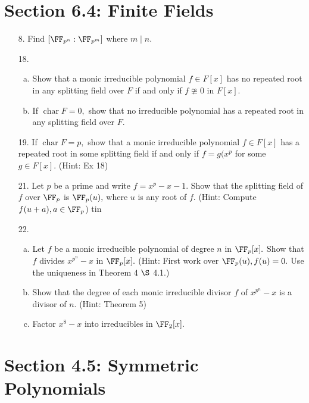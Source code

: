 \documentclass{article}
\DeclareMathOperator{\cha}{char}
\begin{document}
\section*{Section 6.4: Finite Fields}

\begin{itemize}
	\item[8.] Find $[\FF_{p^n}:\FF_{p^m}]$ where $m\mid n.$

	\item[18.]
		\begin{enumerate}[(a)]
			\item Show that a monic irreducible polynomial $f\in F[x]$ has no repeated root in any splitting field over $F$ if and only if $f\ncong 0$ in $F[x].$ 

			\item If $\cha F=0,$ show that no irreducible polynomial has a repeated root in any splitting field over $F.$
				
		\end{enumerate}

	\item[19.] If $\cha F=p,$ show that a monic irreducible polynomial $f\in F[x]$ has a repeated root in some splitting field if and only if $f=g(x^p$ for some $g\in F[x].$ (Hint: Ex 18)

	\item[21.] Let $p$ be a prime and write $f=x^p-x-1.$ Show that the splitting field of $f$ over $\FF_p$ is $\FF_p(u),$ where $u$ is any root of $f.$ (Hint: Compute $f(u+a), a\in\FF_p$)
tin
	\item[22.]
		\begin{enumerate}[(a)]
			\item Let $f$ be a monic irreducible polynomial of degree $n$ in $\FF_p[x].$ Show that $f$ divides $x^{p^n}-x$ in $\FF_p[x].$ (Hint: First work over $\FF_p(u), f(u)=0.$ Use the uniqueness in Theorem 4 $\S$ 4.1.)

			\item Show that the degree of each monic irreducible divisor $f$ of $x^{p^n}-x$ is a divisor of $n.$ (Hint: Theorem 5)

			\item Factor $x^8-x$ into irreducibles in $\FF_2[x].$

		\end{enumerate}
		
\end{itemize}

\section*{Section 4.5: Symmetric Polynomials}
\end{document}
